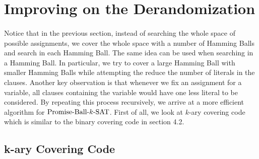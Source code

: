 \documentclass[a4paper,12pts]{article}
\newcommand{\SAT}{\textnormal{$k$-SAT}}
\newcommand{\PBS}{\textnormal{Promise-Ball-$\SAT$}}
\begin{document}
\section{Improving on the Derandomization\cite{Moser11}}
\paragraph{} Notice that in the previous section, instead of searching the whole space of possible assignments, we cover the whole space with a number of Hamming Balls and search in each Hamming Ball. The same idea can be used when searching in a Hamming Ball. In particular, we try to cover a large Hamming Ball with smaller Hamming Balls while attempting the reduce the number of literals in the clauses. Another key observation is that whenever we fix an assignment for a variable, all clauses containing the variable would have one less literal to be considered. By repeating this process recursively, we arrive at a more efficient algorithm for $\PBS$. First of all, we look at $k$-ary covering code which is similar to the binary covering code in section 4.2.
\subsection{k-ary Covering Code}
\end{document}

